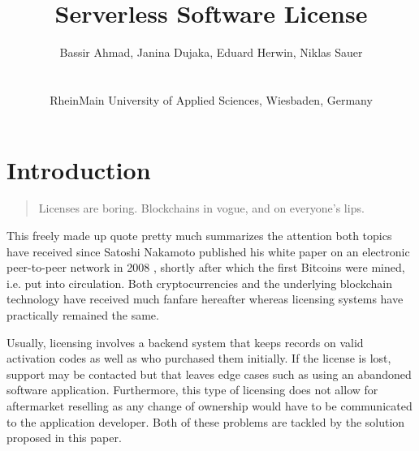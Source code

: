 \documentclass{egpubl}
\title[]
      {Serverless Software License}
\author[B. Ahmad, J. Dujaka, E. Herwin, N. Sauer]
    {\parbox{\textwidth}
        {\centering 
			Bassir Ahmad, Janina Dujaka, Eduard Herwin, Niklas Sauer
        }
        \\
    {\parbox{\textwidth}
        {\centering RheinMain University of Applied Sciences, Wiesbaden, Germany\\
       }
    }
}
\begin{document}


\maketitle




\section{Introduction}
\label{sec:introduction}
\begin{quote}
Licenses are boring. Blockchains in vogue, and on everyone's lips.
\end{quote}

This freely made up quote pretty much summarizes the attention both topics have received since Satoshi Nakamoto published his white paper on an electronic peer-to-peer network in 2008 \cite{nakamoto2019bitcoin}, shortly after which the first Bitcoins were mined, i.e. put into circulation. Both cryptocurrencies and the underlying blockchain technology have received much fanfare hereafter whereas licensing systems have practically remained the same. 

Usually, licensing involves a backend system that keeps records on valid activation codes as well as who purchased them initially. If the license is lost, support may be contacted but that leaves edge cases such as using an abandoned software application. Furthermore, this type of licensing does not allow for aftermarket reselling as any change of ownership would have to be communicated to the application developer. Both of these problems are tackled by the solution proposed in this paper.
\end{document}

